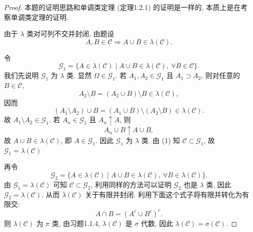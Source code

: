         \begin{proof}
            本题的证明思路和单调类定理 (定理1.2.1) 的证明是一样的, 本质上是在考察单调类定理的证明. 

            由于 $\lambda$ 类对可列不交并封闭, 由题设
            \[
                A,B\in\mathcal{C}\Rightarrow A\cup B\in\lambda(\mathcal{C}).\tag{1}
            \]

            令
            \[
                \mathcal{G}_1=\{A\in\lambda(\mathcal{C})\mid A\cup B\in\lambda(\mathcal{C}),\ \forall B\in\mathcal{C}\}.
            \]
            我们先说明 $\mathcal{G}_1$ 为 $\lambda$ 类. 
            显然 $\Omega\in\mathcal{G}_1$. 
            若 $A_1,A_2\in\mathcal{G}_1$ 且 $A_1\supset A_2$, 
            则对任意的 $B\in\mathcal{C}$, 
            \[
                A_2\setminus B=(A_2\cup B)\setminus B\in\lambda(\mathcal{C}),
            \]
            因而
            \[
                (A_1\setminus A_2)\cup B
                =(A_1\cup B)\setminus(A_2\setminus B)\in\lambda(\mathcal{C}).
            \]
            故 $A_1\setminus A_2\in\mathcal{G}_1$.  
            若 $A_n\in\mathcal{G}_1$ 且 $A_n\uparrow A$, 则
            \[
                A_n\cup B\uparrow A\cup B,
            \]
            故 $A\cup B\in\lambda(\mathcal{C})$, 
            即 $A\in\mathcal{G}_1$. 
            因此 $\mathcal{G}_1$ 为 $\lambda$ 类. 
            由 (1) 知 $\mathcal{C}\subset\mathcal{G}_1$, 
            故 $\mathcal{G}_1=\lambda(\mathcal{C})$

            再令
            \[
                \mathcal{G}_2=\{A\in\lambda(\mathcal{C})\mid A\cup B\in\lambda(\mathcal{C}),\ \forall B\in\lambda(\mathcal{C})\}.
            \]
            由 $\mathcal{G}_1=\lambda(\mathcal{C})$ 可知 $\mathcal{C}\subset\mathcal{G}_2$, 
            利用同样的方法可以证明 $\mathcal{G}_2$ 也是 $\lambda$ 类, 
            因此 $\mathcal{G}_2=\lambda(\mathcal{C})$. 
            从而 $\lambda(\mathcal{C})$ 关于有限并封闭. 
            利用下面这个式子将有限并转化为有限交: 
            \[
                A\cap B=(A^c\cup B^c)^c.
            \]
            则 $\lambda(\mathcal{C})$ 为 $\pi$ 类, 由习题1.1.4, $\lambda(\mathcal{C})$ 是 $\sigma$ 代数, 因此 $\lambda(\mathcal{C})=\sigma(\mathcal{C})$.
        \end{proof}
